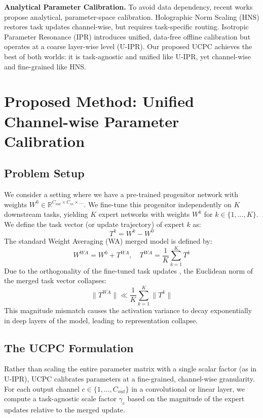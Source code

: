 \documentclass{article}
\theoremstyle{plain}
\theoremstyle{definition}
\theoremstyle{remark}
\begin{document}
\textbf{Analytical Parameter Calibration.} To avoid data dependency, recent works propose analytical, parameter-space calibration. Holographic Norm Scaling (HNS) \cite{anonymous26b} restores task updates channel-wise, but requires task-specific routing. Isotropic Parameter Resonance (IPR) \cite{anonymous26c} introduces unified, data-free offline calibration but operates at a coarse layer-wise level (U-IPR). Our proposed UCPC achieves the best of both worlds: it is task-agnostic and unified like U-IPR, yet channel-wise and fine-grained like HNS.

\section{Proposed Method: Unified Channel-wise Parameter Calibration}
\label{sec:ucpc}

\subsection{Problem Setup}
We consider a setting where we have a pre-trained progenitor network with weights $W^0 \in \mathbb{R}^{C_{out} \times C_{in} \times \dots}$. We fine-tune this progenitor independently on $K$ downstream tasks, yielding $K$ expert networks with weights $W^k$ for $k \in \{1, \dots, K\}$. We define the task vector (or update trajectory) of expert $k$ as:
\begin{equation}
  T^k = W^k - W^0
\end{equation}
The standard Weight Averaging (WA) merged model is defined by:
\begin{equation}
  W^{WA} = W^0 + T^{WA}, \quad T^{WA} = \frac{1}{K}\sum_{k=1}^K T^k
\end{equation}
Due to the orthogonality of the fine-tuned task updates \cite{choshen22}, the Euclidean norm of the merged task vector collapses:
\begin{equation}
  \|T^{WA}\| \ll \frac{1}{K}\sum_{k=1}^K \|T^k\|
\end{equation}
This magnitude mismatch causes the activation variance to decay exponentially in deep layers of the model, leading to representation collapse.

\subsection{The UCPC Formulation}
Rather than scaling the entire parameter matrix with a single scalar factor (as in U-IPR), UCPC calibrates parameters at a fine-grained, channel-wise granularity. For each output channel $c \in \{1, \dots, C_{out}\}$ in a convolutional or linear layer, we compute a task-agnostic scale factor $\gamma_c$ based on the magnitude of the expert updates relative to the merged update.
\end{document}
